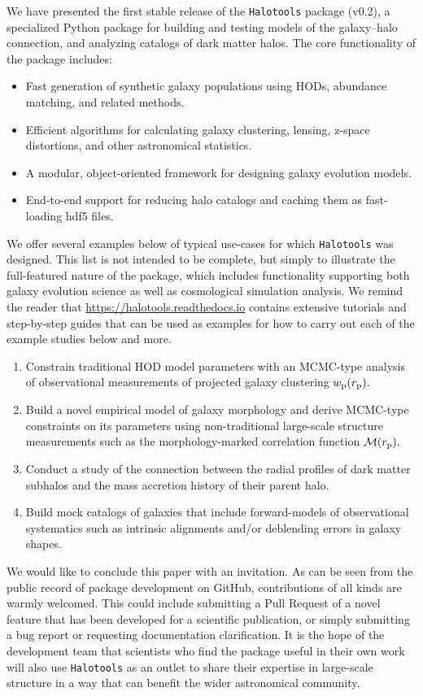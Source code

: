 \documentclass[twocolumn, tighten]{aastex6}
\newcommand{\ben}{\begin{enumerate}}
\newcommand{\een}{\end{enumerate}}
\newcommand{\bit}{\begin{itemize}}
\newcommand{\eit}{\end{itemize}}
\newcommand{\rproj}{r_{\rm p}}
\begin{document}
We have presented the first stable release of the {\tt Halotools} package (v0.2), a specialized Python package for building and testing models of the galaxy--halo connection, and analyzing catalogs of dark matter halos. The core functionality of the package includes:

\bit
\item Fast generation of synthetic galaxy populations using HODs, abundance matching, and related methods.
\item Efficient algorithms for calculating galaxy clustering, lensing, z-space distortions, and other astronomical statistics.
\item A modular, object-oriented framework for designing galaxy evolution models.
\item End-to-end support for reducing halo catalogs and caching them as fast-loading hdf5 files.
\eit

We offer several examples below of typical use-cases for which {\tt Halotools} was designed. This list is not intended to be complete, but simply to illustrate the full-featured nature of the package, which includes functionality supporting both galaxy evolution science as well as cosmological simulation analysis. We remind the reader that \url{https://halotools.readthedocs.io} contains extensive tutorials and step-by-step guides that can be used as examples for how to carry out each of the example studies below and more.

\ben
\item Constrain traditional HOD model parameters with an MCMC-type analysis of observational measurements of projected galaxy clustering $w_{\rm p}(\rproj).$
\item Build a novel empirical model of galaxy morphology and derive MCMC-type constraints on its parameters using non-traditional large-scale structure measurements such as the morphology-marked correlation function $\mathcal{M}(\rproj).$
\item Conduct a study of the connection between the radial profiles of dark matter subhalos and the mass accretion history of their parent halo.
\item Build mock catalogs of galaxies that include forward-models of observational systematics such as intrinsic alignments and/or deblending errors in galaxy shapes.
\een

We would like to conclude this paper with an invitation. As can be seen from the public record of package development on GitHub, contributions of all kinds are warmly welcomed. This could include submitting a Pull Request of a novel feature that has been developed for a scientific publication, or simply submitting a bug report or requesting documentation clarification. It is the hope of the development team that scientists who find the package useful in their own work will also use {\tt Halotools} as an outlet to share their expertise in large-scale structure in a way that can benefit the wider astronomical community.
\end{document}
